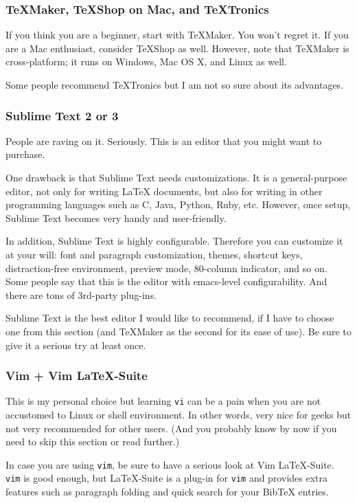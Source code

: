 \documentclass[11pt]{article}
\begin{document}
\subsubsection{TeXMaker, TeXShop on Mac, and TeXTronics}
If you think you are a beginner, start with TeXMaker. You won't regret it. If
you are a Mac enthusiast, consider TeXShop as well. However, note that
TeXMaker is cross-platform; it runs on Windows, Mac OS X, and Linux as well.

Some people recommend TeXTronics but I am not so sure about its advantages.

\subsubsection{Sublime Text 2 or 3}
People are raving on it. Seriously. This is an editor that you might want to
purchase. 

One drawback is that Sublime Text needs customizations. It is a
general-purpose editor, not only for writing LaTeX documents, but also for
writing in other programming languages such as C, Java, Python, Ruby, etc.
However, once setup, Sublime Text becomes very handy and user-friendly. 

In addition, Sublime Text is highly configurable. Therefore you can customize
it at your will: font and paragraph customization, themes, shortcut keys,
distraction-free environment, preview mode, 80-column indicator, and so on. 
Some people say that this is the editor with emacs-level configurability.
And there are tons of 3rd-party plug-ins. 

Sublime Text is the best editor I would like to recommend, if I have to choose
one from this section (and TeXMaker as the second for its ease of use). Be
sure to give it a serious try at least once.

\subsubsection{Vim + Vim LaTeX-Suite}
This is my personal choice but learning \texttt{vi} can be a pain when you are
not accustomed to Linux or shell environment. In other words, very nice for
geeks but not very recommended for other users. (And you probably know by now
if you need to skip this section or read further.)

In case you are using \texttt{vim}, be sure to have a serious look at Vim
LaTeX-Suite. \texttt{vim} is good enough, but LaTeX-Suite is a plug-in for
\texttt{vim} and provides extra features such as paragraph folding and quick
search for your BibTeX entries. 
\end{document}
